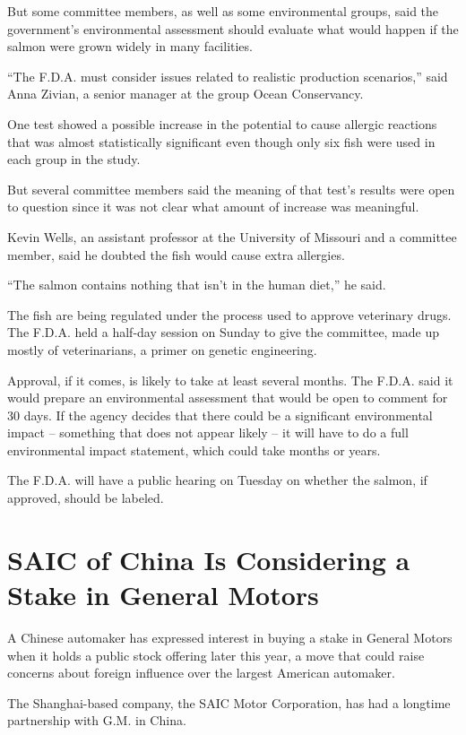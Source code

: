 ﻿\documentclass[12pt]{article}
\begin{document}
But some committee members, as well as some environmental groups, said the government's
environmental assessment should evaluate what would happen if the salmon were grown widely in many
facilities.

``The F.D.A. must consider issues related to realistic production scenarios,'' said Anna Zivian, a
senior manager at the group Ocean Conservancy.

One test showed a possible increase in the potential to cause allergic reactions that was almost
statistically significant even though only six fish were used in each group in the study.

But several committee members said the meaning of that test's results were open to question since it
was not clear what amount of increase was meaningful.

Kevin Wells, an assistant professor at the University of Missouri and a committee member, said he
doubted the fish would cause extra allergies.

``The salmon contains nothing that isn't in the human diet,'' he said.

The fish are being regulated under the process used to approve veterinary drugs. The F.D.A. held a
half-day session on Sunday to give the committee, made up mostly of veterinarians, a primer on
genetic engineering.

Approval, if it comes, is likely to take at least several months. The F.D.A. said it would prepare
an environmental assessment that would be open to comment for 30 days. If the agency decides that
there could be a significant environmental impact -- something that does not appear likely -- it
will have to do a full environmental impact statement, which could take months or years.

The F.D.A. will have a public hearing on Tuesday on whether the salmon, if approved, should be
labeled.

\pagebreak
\section{SAIC of China Is Considering a Stake in General Motors}

\lettrine{A}{} Chinese automaker has expressed interest in buying a stake
in General Motors when it holds a public stock offering later this year, a move that could raise
concerns about foreign influence over the largest American automaker.

The Shanghai-based company, the SAIC Motor Corporation, has had a longtime partnership with G.M. in
China.
\end{document}
